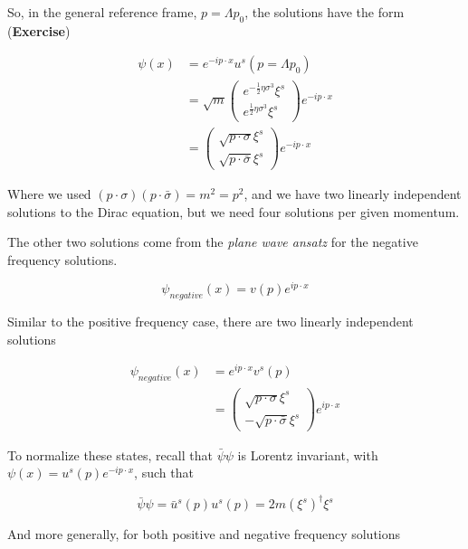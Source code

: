 \noindent So, in the general reference frame, $p=\Lambda p_0$, the solutions have the form (\textbf{Exercise})

\begin{align}
\psi(x) &= e^{-i p \cdot x} u^s(p=\Lambda p_0) \\
&= \sqrt{m} \left( \begin{array}{c} e^{-\frac{1}{2} \eta \sigma^3} \xi^s \\ e^{\frac{1}{2} \eta \sigma^3} \xi^s \end{array} \right) e^{-i p \cdot x} \\
&= \left( \begin{array}{c} \sqrt{p\cdot \sigma} \xi^s \\ \sqrt{p \cdot \bar{\sigma}} \xi^s \end{array} \right) e^{-i p \cdot x}
\end{align}

\noindent Where we used $(p \cdot \sigma)(p \cdot \bar{\sigma}) = m^2 = p^2$, and we have two linearly independent solutions to the Dirac equation, but we need four solutions per given momentum. 

\noindent The other two solutions come from the \textit{plane wave ansatz} for the negative frequency solutions.

\begin{equation}
\psi_{negative}(x) = v(p) e^{i p \cdot x}
\end{equation}

\noindent Similar to the positive frequency case, there are two linearly independent solutions

\begin{align}
\psi_{negative} (x) &= e^{i p \cdot x} v^s (p) \\
&= \left( \begin{array}{c} \sqrt{p\cdot \sigma} \xi^s \\ -\sqrt{p \cdot \bar{\sigma}} \xi^s \end{array} \right) e^{i p \cdot x}
\end{align}

\noindent To normalize these states, recall that $\bar{\psi}\psi$ is Lorentz invariant, with $\psi(x) = u^s(p) e^{-ip \cdot x}$, such that 

\begin{equation}
\bar{\psi} \psi = \bar{u}^s (p) u^s (p) = 2 m (\xi^s)^\dagger \xi^s
\end{equation}

\noindent And more generally, for both positive and negative frequency solutions

